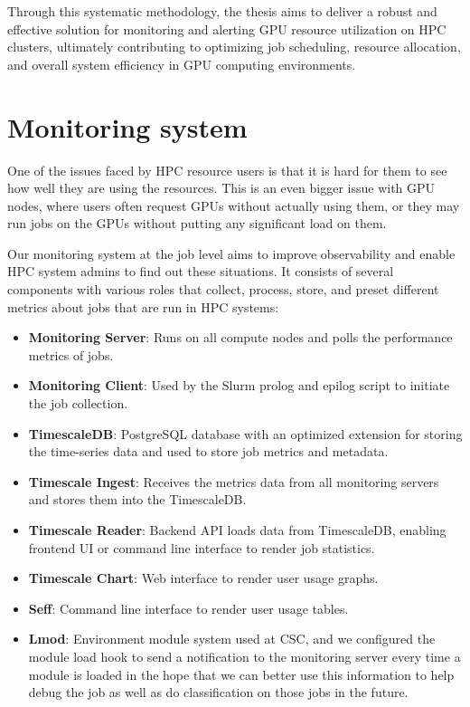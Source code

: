 Through this systematic methodology, the thesis aims to deliver a robust and effective solution for monitoring and alerting GPU resource utilization on HPC clusters, ultimately contributing to optimizing job scheduling, resource allocation, and overall system efficiency in GPU computing environments.

\section{Monitoring system}
One of the issues faced by HPC resource users is that it is hard for them to see how well they are using the resources. This is an even bigger issue with GPU nodes, where users often request GPUs without actually using them, or they may run jobs on the GPUs without putting any significant load on them.

Our monitoring system at the job level aims to improve observability and enable HPC system admins to find out these situations. It consists of several components with various roles that collect, process, store, and preset different metrics about jobs that are run in HPC systems:

\begin{itemize}
    \item \textbf{Monitoring Server}: Runs on all compute nodes and polls the performance metrics of jobs.
    \item \textbf{Monitoring Client}: Used by the Slurm prolog and epilog script to initiate the job collection.
    \item \textbf{TimescaleDB}: PostgreSQL database with an optimized extension for storing the time-series data and used to store job metrics and metadata.
    \item \textbf{Timescale Ingest}: Receives the metrics data from all monitoring servers and stores them into the TimescaleDB.
    \item \textbf{Timescale Reader}: Backend API loads data from TimescaleDB, enabling frontend UI or command line interface to render job statistics.
    \item \textbf{Timescale Chart}: Web interface to render user usage graphs.
    \item \textbf{Seff}: Command line interface to render user usage tables.
    \item \textbf{Lmod}: Environment module system used at CSC, and we configured the module load hook to send a notification to the monitoring server every time a module is loaded in the hope that we can better use this information to help debug the job as well as do classification on those jobs in the future.
\end{itemize}

